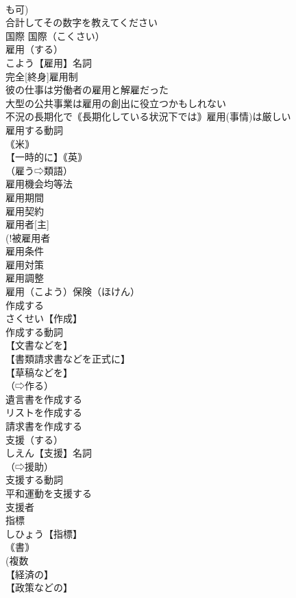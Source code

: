 \documentclass[8pt]{extreport}
\begin{document}
\begin{CJK}{UTF8}{min}
\\	も可)
\\	合計してその数字を教えてください
\\	国際		国際（こくさい）
\\	雇用（する）		
\\	こよう【雇用】名詞
\\	完全[終身]雇用制
\\	彼の仕事は労働者の雇用と解雇だった
\\	大型の公共事業は雇用の創出に役立つかもしれない
\\	不況の長期化で｟長期化している状況下では｠雇用(事情)は厳しい
\\	雇用する動詞
\\	｟米｠ 
\\	【一時的に】｟英｠
\\	（雇う⇨類語）
\\	雇用機会均等法
\\	雇用期間
\\	雇用契約
\\	雇用者[主]
\\	(!被雇用者 
\\	雇用条件
\\	雇用対策
\\	雇用調整
\\	雇用（こよう）保険（ほけん）
\\	作成する		
\\	さくせい【作成】
\\	作成する動詞
\\	【文書などを】
\\	【書類請求書などを正式に】
\\	【草稿などを】
\\	（⇨作る）
\\	遺言書を作成する
\\	リストを作成する
\\	請求書を作成する
\\	支援（する）		
\\	しえん【支援】名詞
\\	（⇨援助）
\\	支援する動詞
\\	平和運動を支援する
\\	支援者
\\	指標
\\	しひょう【指標】
\\	｟書｠
\\	(複数 
\\	【経済の】
\\	【政策などの】

\end{CJK}
\end{document}
